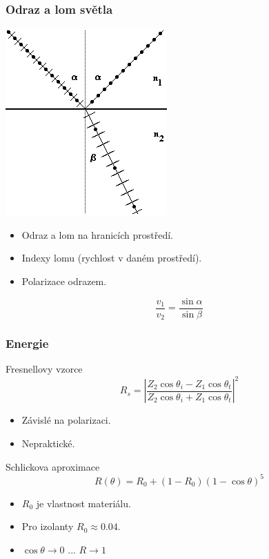 \begin{frame}
    \frametitle{Odraz a lom světla}
    \includegraphics[width=.4\textwidth]{pics/physicallyBasedRendering/image106}
    \begin{itemize}
        \item Odraz a lom na hranicích prostředí.
        \item Indexy lomu (rychlost v daném prostředí).
        \item Polarizace odrazem.
    \end{itemize}
    \begin{equation*}
        \frac{v_1}{v_2} = \frac{\sin\alpha}{\sin\beta}
    \end{equation*}
\end{frame}

\begin{frame}
    \frametitle{Energie}
    Fresnellovy vzorce
    \begin{equation*}
        R_s = \left| \frac{Z_2 \cos \theta_i - Z_1 \cos \theta_t}{Z_2 \cos \theta_i + Z_1 \cos \theta_t} \right|^2
    \end{equation*}
    \begin{itemize}
        \item Závislé na polarizaci.
        \item Nepraktické.
    \end{itemize}
    \pause\vfill
    Schlickova aproximace
    \begin{equation*}
        R(\theta) = R_0 + (1-R_0)(1-\cos\theta)^5
    \end{equation*}
    \begin{itemize}
        \item $R_0$ je vlastnost materiálu.
        \item Pro izolanty $R_0 \approx 0.04$.
        \item $\cos\theta \rightarrow 0$ ... $R \rightarrow 1$
    \end{itemize}
\end{frame}

